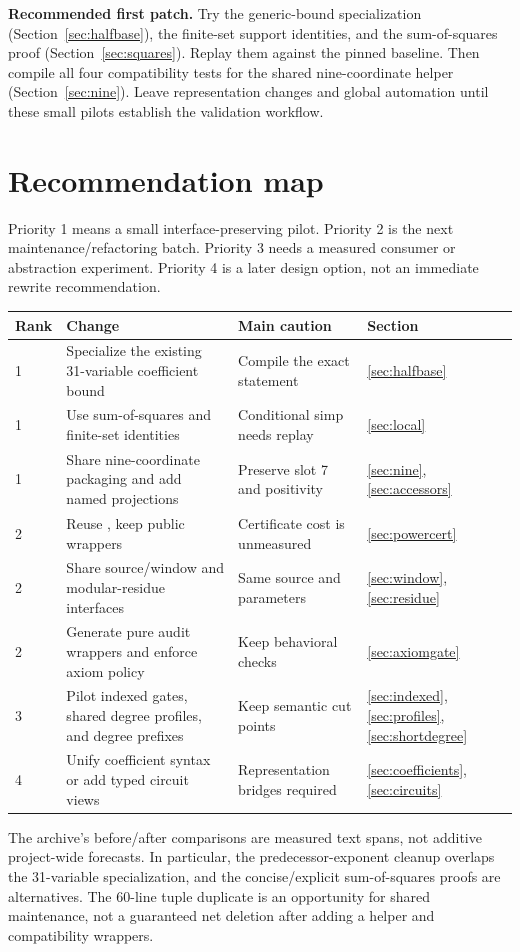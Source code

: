 \vspace{8pt}
\textbf{Recommended first patch.} Try the generic-bound specialization
(Section~\ref{sec:halfbase}), the finite-set support identities, and the
sum-of-squares proof (Section~\ref{sec:squares}). Replay them against the
pinned baseline. Then compile all four compatibility tests for the shared
nine-coordinate helper (Section~\ref{sec:nine}). Leave representation
changes and global automation until these small pilots establish the
validation workflow.

\newpage
\section*{Recommendation map}

Priority 1 means a small interface-preserving pilot. Priority 2 is the next
maintenance/refactoring batch. Priority 3 needs a measured consumer or
abstraction experiment. Priority 4 is a later design option, not an immediate
rewrite recommendation.

\small
\begin{tabularx}{\linewidth}{@{}L{0.42in}YL{1.35in}L{0.56in}@{}}
\toprule
Rank & Change & Main caution & Section\\
 & Specialize the existing 31-variable coefficient bound & Compile the exact statement & \ref{sec:halfbase}\\[4pt]
1 & Use sum-of-squares and finite-set identities & Conditional simp needs replay & \ref{sec:local}\\[4pt]
1 & Share nine-coordinate packaging and add named projections & Preserve slot 7 and positivity & \ref{sec:nine}, \ref{sec:accessors}\\[4pt]
2 & Reuse , keep public wrappers & Certificate cost is unmeasured & \ref{sec:powercert}\\[4pt]
2 & Share source/window and modular-residue interfaces & Same source and parameters & \ref{sec:window}, \ref{sec:residue}\\[4pt]
2 & Generate pure audit wrappers and enforce axiom policy & Keep behavioral checks & \ref{sec:axiomgate}\\[4pt]
3 & Pilot indexed gates, shared degree profiles, and degree prefixes & Keep semantic cut points & \ref{sec:indexed}, \ref{sec:profiles}, \ref{sec:shortdegree}\\[4pt]
4 & Unify coefficient syntax or add typed circuit views & Representation bridges required & \ref{sec:coefficients}, \ref{sec:circuits}\\
\bottomrule
\end{tabularx}
\normalsize

The archive's before/after comparisons are measured text spans, not additive
project-wide forecasts. In particular, the predecessor-exponent cleanup
overlaps the 31-variable specialization, and the concise/explicit
sum-of-squares proofs are alternatives. The 60-line tuple duplicate is an
opportunity for shared maintenance, not a guaranteed net deletion after
adding a helper and compatibility wrappers.

\vspace{5pt}
{\small\setlength{\parskip}{1pt}\tableofcontents}
